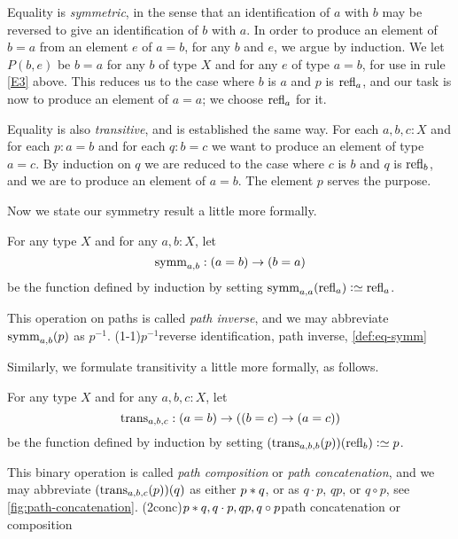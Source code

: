 Equality is \emph{symmetric}, in the sense that an identification of $a$ with $b$ may be reversed to give an identification of $b$ with $a$.  In
order to produce an element of $b=a$ from an element $e$ of $a=b$, for any $b$ and $e$, we argue by induction.  We let $P(b,e)$ be $b=a$ for any
$b$ of type $X$ and for any $e$ of type $a=b$, for use in rule \ref{E3} above.
This reduces us to the case where $b$ is $a$ and $p$ is $\mathrm{refl}_{a}$, and
our task is now to produce an element of $a=a$; we choose $\mathrm{refl}_{a}$ for it.

Equality is also \emph{transitive}, and is established the same way.
For each $a,b,c:X$ and for each $p:a=b$ and for each $q:b=c$ we want to produce an
element of type $a=c$.  By induction on $q$ we are reduced to the case where $c$ is $b$ and $q$ is $\mathrm{refl}_{b}$, and we are to produce an element
of $a=b$.  The element $p$ serves the purpose.

Now we state our symmetry result a little more formally.

\begin{definition}\label{def:eq-symm}
  For any type $X$ and for any $a,b:X$, let $$\symm_{a,b} : (a=b) \to (b=a)$$
  be the function defined by induction by setting
  $\symm_{a,a}(\refl a) \defeq \refl a$.

  This operation on paths is called \emph{path inverse}, and we may abbreviate $\symm_{a,b}(p)$ as $p^{-1}$.
  \glossary(1-1){$p^{-1}$}{reverse identification, path inverse, \cref{def:eq-symm}}
\end{definition}

Similarly, we formulate transitivity a little more formally, as follows.

\begin{definition}\label{def:eq-trans}
  For any type $X$ and for any $a,b,c:X$, let $$\trans_{a,b,c} : (a=b) \to ((b=c) \to (a=c))$$ be the function defined by induction by setting
  $(\trans_{a,b,b} (p)) (\refl b ) \defeq p$.

  This binary operation is called \emph{path composition} or \emph{path concatenation},
  and we may abbreviate $(\trans_{a,b,c}(p))(q)$ as either $p * q$, or as $q \cdot p$, $qp$, or $q \circ p$, see \cref{fig:path-concatenation}.  
  \glossary(2conc){$p\protect* q, q\cdot p, qp, q\circ p$}{path concatenation or composition}
\end{definition}

